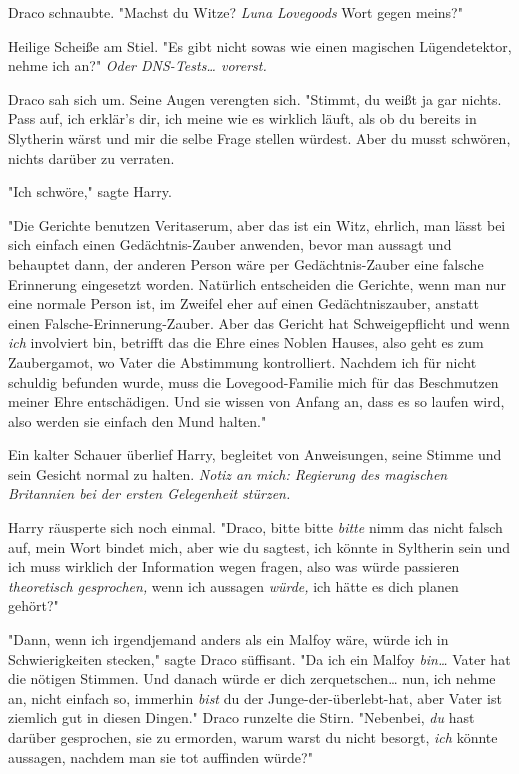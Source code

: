 {Draco schnaubte. "Machst du Witze? \emph{Luna Lovegoods} Wort gegen meins?"

Heilige Scheiße am Stiel. "Es gibt nicht sowas wie einen magischen Lügendetektor, nehme ich an?" \emph{Oder DNS-Tests… vorerst.}

Draco sah sich um. Seine Augen verengten sich. "Stimmt, du weißt ja gar nichts. Pass auf, ich erklär's dir, ich meine wie es wirklich läuft, als ob du bereits in Slytherin wärst und mir die selbe Frage stellen würdest. Aber du musst schwören, nichts darüber zu verraten.

"Ich schwöre," sagte Harry.

"Die Gerichte benutzen Veritaserum, aber das ist ein Witz, ehrlich, man lässt bei sich einfach einen Gedächtnis-Zauber anwenden, bevor man aussagt und behauptet dann, der anderen Person wäre per Gedächtnis-Zauber eine falsche Erinnerung eingesetzt worden. Natürlich entscheiden die Gerichte, wenn man nur eine normale Person ist, im Zweifel eher auf einen Gedächtniszauber, anstatt einen Falsche-Erinnerung-Zauber. Aber das Gericht hat Schweigepflicht und wenn \emph{ich} involviert bin, betrifft das die Ehre eines Noblen Hauses, also geht es zum Zaubergamot, wo Vater die Abstimmung kontrolliert. Nachdem ich für nicht schuldig befunden wurde, muss die Lovegood-Familie mich für das Beschmutzen meiner Ehre entschädigen. Und sie wissen von Anfang an, dass es so laufen wird, also werden sie einfach den Mund halten."

Ein kalter Schauer überlief Harry, begleitet von Anweisungen, seine Stimme und sein Gesicht normal zu halten. \emph{Notiz an mich: Regierung des magischen Britannien bei der ersten Gelegenheit stürzen.}

Harry räusperte sich noch einmal. "Draco, bitte bitte \emph{bitte} nimm das nicht falsch auf, mein Wort bindet mich, aber wie du sagtest, ich könnte in Syltherin sein und ich muss wirklich der Information wegen fragen, also was würde passieren \emph{theoretisch gesprochen,} wenn ich aussagen \emph{würde,} ich hätte es dich planen gehört?"

"Dann, wenn ich irgendjemand anders als ein Malfoy wäre, würde ich in Schwierigkeiten stecken," sagte Draco süffisant. "Da ich ein Malfoy \emph{bin…} Vater hat die nötigen Stimmen. Und danach würde er dich zerquetschen… nun, ich nehme an, nicht einfach so, immerhin \emph{bist} du der Junge-der-überlebt-hat, aber Vater ist ziemlich gut in diesen Dingen." Draco runzelte die Stirn. "Nebenbei, \emph{du} hast darüber gesprochen, sie zu ermorden, warum warst du nicht besorgt, \emph{ich} könnte aussagen, nachdem man sie tot auffinden würde?"

}
